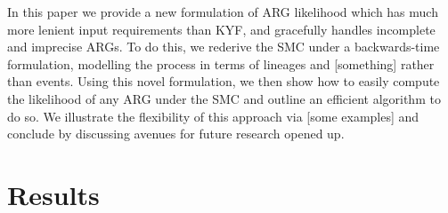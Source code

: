 \documentclass{article}
\begin{document}
In this paper we provide a new formulation of ARG likelihood which 
has much more lenient input requirements than KYF, and gracefully handles
incomplete and imprecise ARGs.
To do this, we rederive the SMC under a backwards-time formulation,
modelling the process in terms of lineages and [something] rather
than events. Using this novel formulation, we then show how to 
easily compute the likelihood of any ARG under the SMC and outline 
an efficient algorithm to do so. We illustrate the flexibility of this
approach via [some examples] and conclude by discussing avenues
for future research opened up.

\section*{Results}



\end{document}
